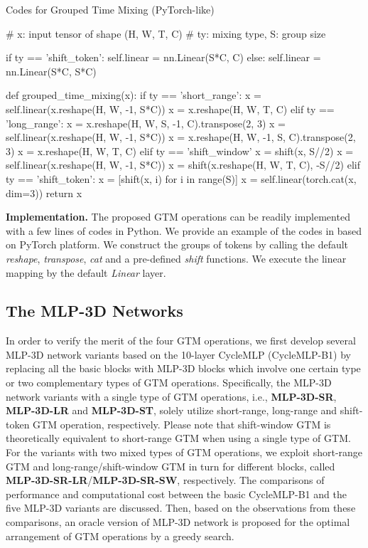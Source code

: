 \documentclass[10pt,twocolumn,letterpaper]{article}
\begin{document}
\begin{algorithm}[!tb]
\small
\caption{\small Codes for Grouped Time Mixing (PyTorch-like)}
\vspace{-0.05in}
\begin{PythonA}[frame=none]
# x: input tensor of shape (H, W, T, C)
# ty: mixing type, S: group size

if ty == 'shift_token':
  self.linear = nn.Linear(S*C, C)
else:
  self.linear = nn.Linear(S*C, S*C)

def grouped_time_mixing(x):
  if ty == 'short_range':
    x = self.linear(x.reshape(H, W, -1, S*C))
    x = x.reshape(H, W, T, C)
  elif ty == 'long_range':
    x = x.reshape(H, W, S, -1, C).transpose(2, 3)
    x = self.linear(x.reshape(H, W, -1, S*C))
    x = x.reshape(H, W, -1, S, C).transpose(2, 3)
    x = x.reshape(H, W, T, C)
  elif ty == 'shift_window'
    x = shift(x, S//2)
    x = self.linear(x.reshape(H, W, -1, S*C))
    x = shift(x.reshape(H, W, T, C), -S//2)
  elif ty == 'shift_token':
    x = [shift(x, i) for i in range(S)]
    x = self.linear(torch.cat(x, dim=3))
  return x
\end{PythonA}
\label{algo}
\vspace{-0.05in}
\end{algorithm}

\textbf{Implementation.} The proposed GTM operations can be readily implemented with a few lines of codes in Python. We provide an example of the codes in  based on PyTorch \cite{NEURIPS2019_9015} platform. We construct the groups of tokens by calling the default \emph{reshape}, \emph{transpose}, \emph{cat} and a pre-defined \emph{shift} functions. We execute the linear mapping by the default \emph{Linear} layer.

\subsection{The MLP-3D Networks} \label{subsec:design}
In order to verify the merit of the four GTM operations, we first develop several MLP-3D network variants based on the 10-layer CycleMLP (CycleMLP-B1) \cite{chen2021cyclemlp} by replacing all the basic blocks with MLP-3D blocks which involve one certain type or two complementary types of GTM operations. Specifically, the MLP-3D network variants with a single type of GTM operations, i.e., \textbf{MLP-3D-SR}, \textbf{MLP-3D-LR} and \textbf{MLP-3D-ST}, solely utilize short-range, long-range and shift-token GTM operation, respectively. Please note that shift-window GTM is theoretically equivalent to short-range GTM when using a single type of GTM. For the variants with two mixed types of GTM operations, we exploit short-range GTM and long-range/shift-window GTM in turn for different blocks, called \textbf{MLP-3D-SR-LR}/\textbf{MLP-3D-SR-SW}, respectively. The comparisons of performance and computational cost between the basic CycleMLP-B1 and the five MLP-3D variants are discussed. Then, based on the observations from these comparisons, an oracle version of MLP-3D network is proposed for the optimal arrangement of GTM operations by a greedy search.
\end{document}
